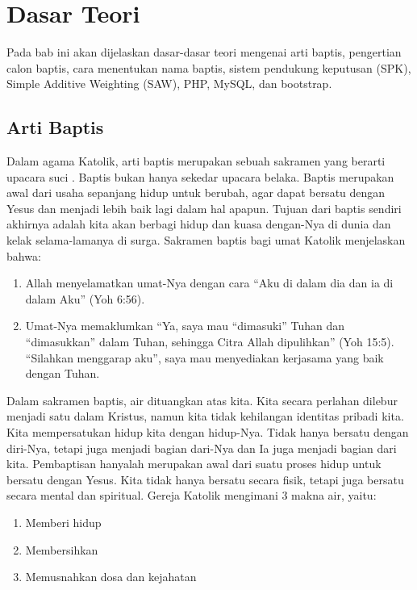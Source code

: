 \chapter{Dasar Teori}
\label{chap:dasarteori}

Pada bab ini akan dijelaskan dasar-dasar teori mengenai arti baptis, pengertian calon baptis, cara menentukan nama baptis, sistem pendukung keputusan (SPK), Simple Additive Weighting (SAW), PHP, MySQL, dan bootstrap.

\section{Arti Baptis}
\label{sec:artibaptis}

Dalam agama Katolik, arti baptis merupakan sebuah sakramen yang berarti upacara suci \cite{sbaptis}. Baptis bukan hanya sekedar upacara belaka. Baptis merupakan awal dari usaha sepanjang hidup untuk berubah, agar dapat bersatu dengan Yesus dan menjadi lebih baik lagi dalam hal apapun. Tujuan dari baptis sendiri akhirnya adalah kita akan berbagi hidup dan kuasa dengan-Nya di dunia dan kelak selama-lamanya di surga. Sakramen baptis bagi umat Katolik menjelaskan bahwa:
\begin{enumerate}
	\item Allah menyelamatkan umat-Nya dengan cara ``Aku di dalam dia dan ia di dalam Aku'' (Yoh 6:56).
	\item Umat-Nya memaklumkan ``Ya, saya mau ``dimasuki'' Tuhan dan ``dimasukkan'' dalam Tuhan, sehingga Citra Allah dipulihkan'' (Yoh 15:5). ``Silahkan menggarap aku'', saya mau menyediakan kerjasama yang baik dengan Tuhan. 
\end{enumerate}

	Dalam sakramen baptis, air dituangkan atas kita. Kita secara perlahan dilebur menjadi satu dalam Kristus, namun kita tidak kehilangan identitas pribadi kita. Kita mempersatukan hidup kita dengan hidup-Nya. Tidak hanya bersatu dengan diri-Nya, tetapi juga menjadi bagian dari-Nya dan Ia juga menjadi bagian dari kita. Pembaptisan hanyalah merupakan awal dari suatu proses hidup untuk bersatu dengan Yesus. Kita tidak hanya bersatu secara fisik, tetapi juga bersatu secara mental dan spiritual. Gereja Katolik mengimani 3 makna air, yaitu:
	
	\begin{enumerate}
		\item Memberi hidup
		\item Membersihkan
		\item Memusnahkan dosa dan kejahatan
	\end{enumerate} 
	
